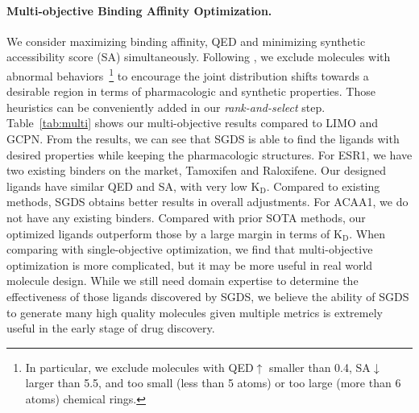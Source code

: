 \documentclass[accepted]{uai2023} %
\begin{document}
\paragraph{Multi-objective Binding Affinity Optimization.} We consider maximizing binding affinity, QED and minimizing synthetic accessibility score (SA) simultaneously. Following \cite{eckmann2022limo}, we exclude molecules with abnormal behaviors~\footnote{ In particular, we exclude molecules with QED$\uparrow$ smaller than 0.4, SA$\downarrow$ larger than 5.5, and too small (less than 5 atoms) or too large (more than 6 atoms) chemical rings.} to encourage the joint distribution shifts towards a desirable region in terms of pharmacologic and synthetic properties. Those heuristics can be conveniently added in our \textit{rank-and-select} step.
Table~\ref{tab:multi} shows our multi-objective results compared to LIMO and GCPN. From the results, we can see that SGDS is able to find the ligands with desired properties while keeping the pharmacologic structures. For ESR1, we have two existing binders on the market, Tamoxifen and Raloxifene. Our designed ligands have similar QED and SA, with very low $\mathrm{K_D}$.  Compared to existing methods, SGDS obtains better results in overall adjustments. For ACAA1, we do not have any existing binders. Compared with prior SOTA methods, our optimized ligands outperform those by a large margin in terms of $\mathrm{K_D}$. When comparing with single-objective optimization, we find that multi-objective optimization is more complicated, but it may be more useful in real world molecule design. While we still need domain expertise to determine the effectiveness of those ligands discovered by SGDS, we believe the ability of SGDS to generate many high quality molecules given multiple metrics is extremely useful in the early stage of drug discovery.
\end{document}
